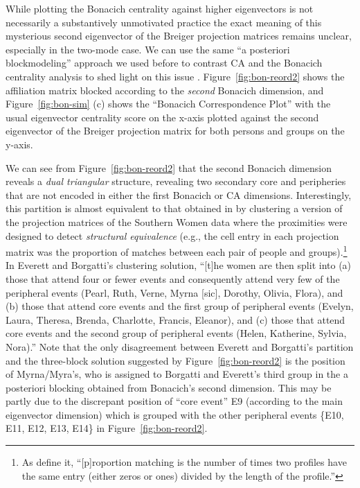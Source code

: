 \documentclass[a4paper,fleqn]{cas-sc}
\begin{document}
While plotting the Bonacich centrality against higher eigenvectors is not necessarily a substantively unmotivated practice \citep[see][for a discussion in the one-mode network case]{iacobucci2017eigenvector} the exact meaning of this mysterious second eigenvector of the Breiger projection matrices remains unclear, especially in the two-mode case. We can use the same ``a posteriori blockmodeling'' approach we used before to contrast CA and the Bonacich centrality analysis to shed light on this issue \citep{wasserman1990correspondence}. Figure~\ref{fig:bon-reord2} shows the affiliation matrix blocked according to the \textit{second} Bonacich dimension, and Figure~\ref{fig:bon-sim} (c) shows the ``Bonacich Correspondence Plot'' with the usual eigenvector centrality score on the x-axis plotted against the second eigenvector of the Breiger projection matrix for both persons and groups on the y-axis. 

We can see from Figure~\ref{fig:bon-reord2} that the second Bonacich dimension reveals a \textit{dual triangular} structure, revealing two secondary core and peripheries that are not encoded in either the first Bonacich or CA dimensions. Interestingly, this partition is almost equivalent to that obtained in \citet[Table 5]{everett2013dual} by clustering a version of the projection matrices of the Southern Women data where the proximities were designed to detect \textit{structural equivalence} (e.g., the cell entry in each projection matrix was the proportion of matches between each pair of people and groups).\footnote{As \citet[208]{everett2013dual} define it, ``[p]roportion matching is the number of times two profiles have the same entry (either zeros or ones) divided by the length of the profile.''} In Everett and Borgatti's \citeyearpar[208]{everett2013dual} clustering solution, ``[t]he women are then split into (a) those that attend four or fewer events and consequently attend very few of the peripheral events (Pearl, Ruth, Verne, Myrna [sic], Dorothy, Olivia, Flora), and (b) those that attend core events and the first group of peripheral events (Evelyn, Laura, Theresa, Brenda, Charlotte, Francis, Eleanor), and (c) those that attend core events and the second group of peripheral events (Helen, Katherine, Sylvia, Nora).'' Note that the only disagreement between Everett and Borgatti's partition and the three-block solution suggested by Figure~\ref{fig:bon-reord2} is the position of Myrna/Myra's, who is assigned to Borgatti and Everett's third group in the a posteriori blocking obtained from Bonacich's second dimension. This may be partly due to the discrepant position of ``core event'' E9 (according to the main eigenvector dimension) which is grouped with the other peripheral events \{E10, E11, E12, E13, E14\} in Figure~\ref{fig:bon-reord2}. 
\end{document}
